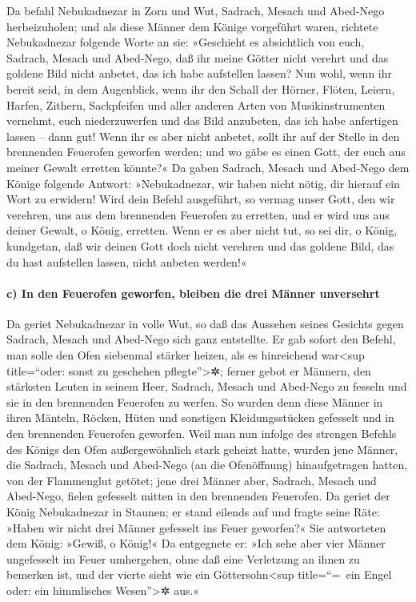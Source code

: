 Da befahl Nebukadnezar in Zorn und Wut, Sadrach, Mesach
und Abed-Nego herbeizuholen; und als diese Männer dem Könige vorgeführt
waren, richtete Nebukadnezar folgende Worte an sie:
»Geschieht es absichtlich von euch, Sadrach, Mesach und Abed-Nego, daß
ihr meine Götter nicht verehrt und das goldene Bild nicht anbetet, das
ich habe aufstellen lassen? Nun wohl, wenn ihr bereit
seid, in dem Augenblick, wenn ihr den Schall der Hörner, Flöten, Leiern,
Harfen, Zithern, Sackpfeifen und aller anderen Arten von
Musikinstrumenten vernehmt, euch niederzuwerfen und das Bild anzubeten,
das ich habe anfertigen lassen -- dann gut! Wenn ihr es aber nicht
anbetet, sollt ihr auf der Stelle in den brennenden Feuerofen geworfen
werden; und wo gäbe es einen Gott, der euch aus meiner Gewalt erretten
könnte?« Da gaben Sadrach, Mesach und Abed-Nego dem
Könige folgende Antwort: »Nebukadnezar, wir haben nicht nötig, dir
hierauf ein Wort zu erwidern! Wird dein Befehl
ausgeführt, so vermag unser Gott, den wir verehren, uns aus dem
brennenden Feuerofen zu erretten, und er wird uns aus deiner Gewalt, o
König, erretten. Wenn er es aber nicht tut, so sei dir, o
König, kundgetan, daß wir deinen Gott doch nicht verehren und das
goldene Bild, das du hast aufstellen lassen, nicht anbeten werden!«

\hypertarget{c-in-den-feuerofen-geworfen-bleiben-die-drei-muxe4nner-unversehrt}{%
\paragraph{c) In den Feuerofen geworfen, bleiben die drei Männer
unversehrt}\label{c-in-den-feuerofen-geworfen-bleiben-die-drei-muxe4nner-unversehrt}}

Da geriet Nebukadnezar in volle Wut, so daß das Aussehen
seines Gesichts gegen Sadrach, Mesach und Abed-Nego sich ganz
entstellte. Er gab sofort den Befehl, man solle den Ofen siebenmal
stärker heizen, als es hinreichend war\textless sup title=``oder: sonst
zu geschehen pflegte''\textgreater✲; ferner gebot er
Männern, den stärksten Leuten in seinem Heer, Sadrach, Mesach und
Abed-Nego zu fesseln und sie in den brennenden Feuerofen zu werfen.
So wurden denn diese Männer in ihren Mänteln, Röcken,
Hüten und sonstigen Kleidungsstücken gefesselt und in den brennenden
Feuerofen geworfen. Weil man nun infolge des strengen
Befehls des Königs den Ofen außergewöhnlich stark geheizt hatte, wurden
jene Männer, die Sadrach, Mesach und Abed-Nego (an die Ofenöffnung)
hinaufgetragen hatten, von der Flammenglut getötet; jene
drei Männer aber, Sadrach, Mesach und Abed-Nego, fielen gefesselt mitten
in den brennenden Feuerofen. Da geriet der König
Nebukadnezar in Staunen; er stand eilends auf und fragte seine Räte:
»Haben wir nicht drei Männer gefesselt ins Feuer geworfen?« Sie
antworteten dem König: »Gewiß, o König!« Da entgegnete
er: »Ich sehe aber vier Männer ungefesselt im Feuer umhergehen, ohne daß
eine Verletzung an ihnen zu bemerken ist, und der vierte sieht wie ein
Göttersohn\textless sup title=``=~ein Engel oder: ein himmlisches
Wesen''\textgreater✲ aus.«

